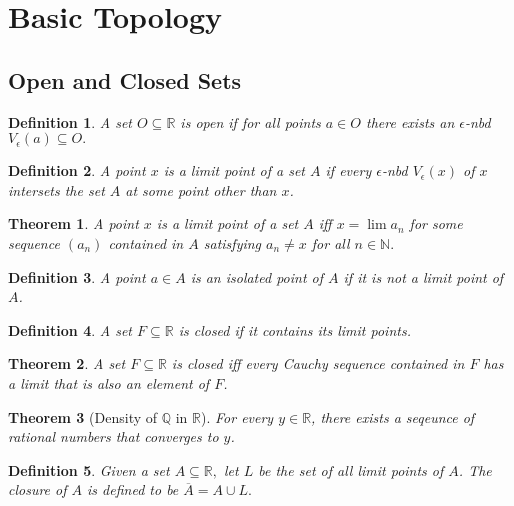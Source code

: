 \documentclass[10pt]{article}
\newtheorem{theorem}{Theorem}[section]
\newtheorem{definition}{Definition}[section]
\begin{document}
\section{Basic Topology}

\subsection{Open and Closed Sets}
 
\begin{definition}
    A set $O\subseteq \mathbb{R}$ is open if for all points $a\in O$ there exists an $\epsilon$-nbd $V_\epsilon(a)\subseteq O.$
\end{definition}

\begin{definition}
    A point $x$ is a limit point of a set $A$ if every $\epsilon$-nbd $V_\epsilon(x)$ of $x$ intersets the set $A$ at some point other than $x$.
\end{definition}

\begin{theorem}
    A point $x$ is a limit point of a set $A$ iff $x=\lim a_n$ for some sequence $(a_n)$ contained in $A$ satisfying $a_n\neq x$ for all $n\in\mathbb{N}.$
\end{theorem}

\begin{definition}
    A point $a\in A$ is an isolated point of $A$ if it is not a limit point of $A$.
\end{definition}

\begin{definition}
    A set $F\subseteq \mathbb{R}$ is closed if it contains its limit points.
\end{definition}

\begin{theorem}
    A set $F\subseteq\mathbb{R}$ is closed iff every Cauchy sequence contained in $F$ has a limit that is also an element of $F$.
\end{theorem}

\begin{theorem}[Density of $\mathbb{Q}$ in $\mathbb{R}$]
    For every $y\in\mathbb{R}$, there exists a seqeunce of rational numbers that converges to $y$.
\end{theorem}

\begin{definition}
    Given a set $A\subseteq\mathbb{R},$ let $L$ be the set of all limit points of $A$. The closure of $A$ is defined to be $\overline{A}=A\cup L.$
\end{definition}
\end{document}
